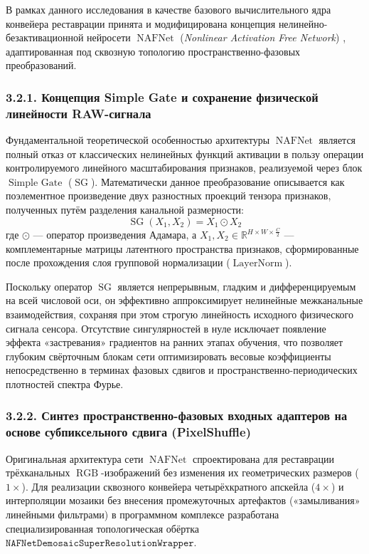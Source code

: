 \documentclass[12pt,a4paper]{article}
\begin{document}
В рамках данного исследования в качестве базового вычислительного ядра конвейера реставрации принята и модифицирована концепция нелинейно-безактивационной нейросети $\operatorname{NAFNet}$ (\textit{Nonlinear Activation Free Network}) \cite{chen2022simple}, адаптированная под сквозную топологию пространственно-фазовых преобразований.

\subsubsection{3.2.1. Концепция Simple Gate и сохранение физической линейности RAW-сигнала}

Фундаментальной теоретической особенностью архитектуры $\operatorname{NAFNet}$ является полный отказ от классических нелинейных функций активации в пользу операции контролируемого линейного масштабирования признаков, реализуемой через блок $\operatorname{Simple~Gate}$ ($\operatorname{SG}$). Математически данное преобразование описывается как поэлементное произведение двух разностных проекций тензора признаков, полученных путём разделения канальной размерности:
\begin{equation}
\operatorname{SG}(X_1, X_2) = X_1 \odot X_2
\end{equation}
где $\odot$ --- оператор произведения Адамара, а $X_1, X_2 \in \mathbb{R}^{H \times W \times \frac{C}{2}}$ --- комплементарные матрицы латентного пространства признаков, сформированные после прохождения слоя групповой нормализации ($\operatorname{LayerNorm}$). 

Поскольку оператор $\operatorname{SG}$ является непрерывным, гладким и дифференцируемым на всей числовой оси, он эффективно аппроксимирует нелинейные межканальные взаимодействия, сохраняя при этом строгую линейность исходного физического сигнала сенсора. Отсутствие сингулярностей в нуле исключает появление эффекта «застревания» градиентов на ранних этапах обучения, что позволяет глубоким свёрточным блокам сети оптимизировать весовые коэффициенты непосредственно в терминах фазовых сдвигов и пространственно-периодических плотностей спектра Фурье.

\subsubsection{3.2.2. Синтез пространственно-фазовых входных адаптеров на основе субпиксельного сдвига (PixelShuffle)}

Оригинальная архитектура сети $\operatorname{NAFNet}$ спроектирована для реставрации трёхканальных $\operatorname{RGB}$-изображений без изменения их геометрических размеров ($1\times$). Для реализации сквозного конвейера четырёхкратного апскейла ($4\times$) и интерполяции мозаики без внесения промежуточных артефактов («замыливания» линейными фильтрами) в программном комплексе разработана специализированная топологическая обёртка $\texttt{NAFNetDemosaicSuperResolutionWrapper}$. 
\end{document}
